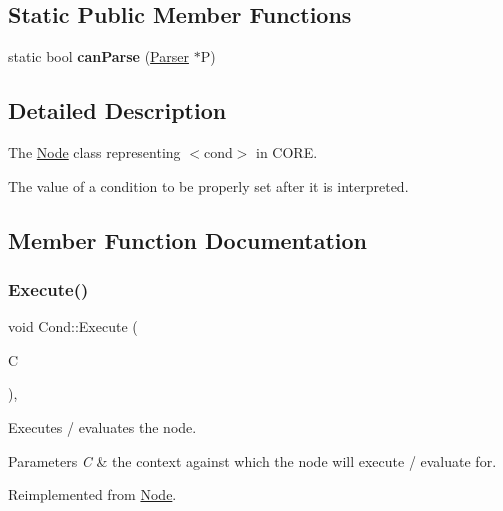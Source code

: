 \subsection*{Static Public Member Functions}
\begin{DoxyCompactItemize}
\item 
\mbox{\label{class_cond_a5adc11f6c1da4be0cd783a22b700ae78}} 
static bool {\bfseries can\+Parse} (\mbox{\hyperlink{class_parser}{Parser}} $\ast$P)
\end{DoxyCompactItemize}


\subsection{Detailed Description}
The \mbox{\hyperlink{class_node}{Node}} class representing {\ttfamily $<$cond$>$} in C\+O\+RE. 

The value of a condition to be properly set after it is interpreted. 

\subsection{Member Function Documentation}
\mbox{\label{class_cond_ae5e176f4872c49912bc792367f4dff80}} 
\subsubsection{\texorpdfstring{Execute()}{Execute()}}
{\footnotesize\ttfamily void Cond\+::\+Execute (\begin{DoxyParamCaption}\item[{\mbox{\hyperlink{class_a_s_t_context}{A\+S\+T\+Context}} \&}]{C }\end{DoxyParamCaption})\hspace{0.3cm}{\ttfamily [override]}, {\ttfamily [virtual]}}

Executes / evaluates the node. 
\begin{DoxyParams}{Parameters}
{\em C} & the context against which the node will execute / evaluate for. \\
\hline
\end{DoxyParams}


Reimplemented from \mbox{\hyperlink{class_node_a27ad1ba81d2596817b361368282bcbfa}{Node}}.

\mbox{\label{class_cond_acb604011c472b21934e134c07f3cf0c1}} 
